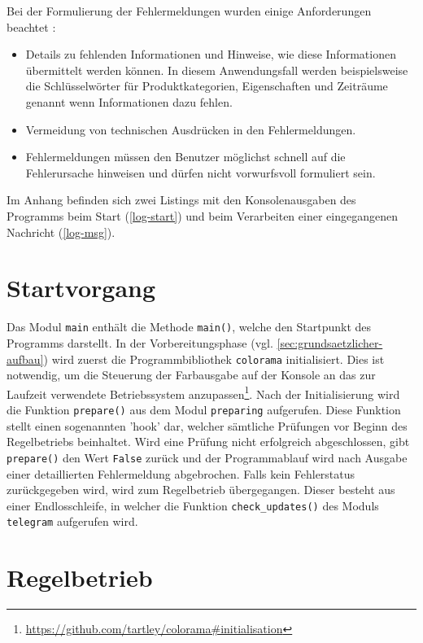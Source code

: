 Bei der Formulierung der Fehlermeldungen wurden einige Anforderungen beachtet \cite[S. 495]{ux}: 

\begin{itemize}
\item Details zu fehlenden Informationen und Hinweise, wie diese Informationen übermittelt werden können. In diesem Anwendungsfall werden beispielsweise die Schlüsselwörter für Produktkategorien, Eigenschaften und Zeiträume genannt wenn Informationen dazu fehlen.
\item Vermeidung von technischen Ausdrücken in den Fehlermeldungen.
\item Fehlermeldungen müssen den Benutzer möglichst schnell auf die Fehlerursache hinweisen und dürfen nicht vorwurfsvoll formuliert sein.
\end{itemize}

Im Anhang befinden sich zwei Listings mit den Konsolenausgaben des Programms beim Start (\autoref{log-start}) und beim Verarbeiten einer eingegangenen Nachricht (\autoref{log-msg}).

\section{Startvorgang}
\label{sec:startvorgang}

Das Modul \lstinline{main} enthält die Methode \lstinline{main()}, welche den Startpunkt des Programms darstellt. In der Vorbereitungsphase (vgl. \autoref{sec:grundsaetzlicher-aufbau}) wird zuerst die Programmbibliothek \lstinline{colorama} initialisiert. Dies ist notwendig, um die Steuerung der Farbausgabe auf der Konsole an das zur Laufzeit verwendete Betriebssystem anzupassen\footnote{\url{https://github.com/tartley/colorama\#initialisation}}. Nach der Initialisierung wird die Funktion \lstinline{prepare()} aus dem Modul \lstinline{preparing} aufgerufen. Diese Funktion stellt einen sogenannten 'hook' dar, welcher sämtliche Prüfungen vor Beginn des Regelbetriebs beinhaltet. Wird eine Prüfung nicht erfolgreich abgeschlossen, gibt \lstinline{prepare()} den Wert \lstinline{False} zurück und der Programmablauf wird nach Ausgabe einer detaillierten Fehlermeldung abgebrochen. Falls kein Fehlerstatus zurückgegeben wird, wird zum Regelbetrieb übergegangen. Dieser besteht aus einer Endlosschleife, in welcher die Funktion \lstinline{check_updates()} des Moduls \lstinline{telegram} aufgerufen wird.

\section{Regelbetrieb}

